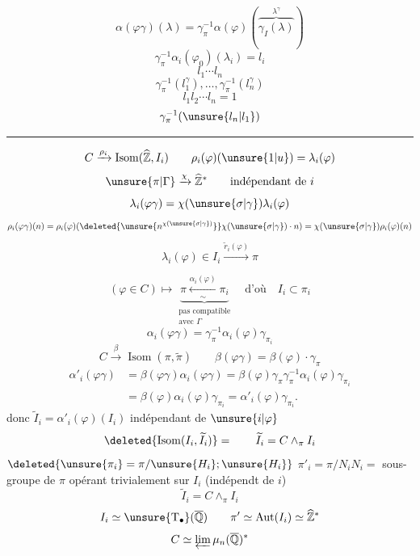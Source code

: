\[
\alpha(\varphi\gamma)(\lambda)=\gamma_\pi^{-1}\alpha(\varphi)(\overbrace{\gamma_I(\lambda)}^{\lambda^\gamma})
\]
\[
\gamma_\pi^{-1}\alpha_i(\varphi_0)(\lambda_i)=l_i
\]
\[
l_1\cdots l_n
\]
\[
\gamma_\pi^{-1}(l_1^\gamma),\ldots,\gamma_\pi^{-1}(l_n^\gamma)
\]
\[
l_1l_2\cdots l_n=1
\]
\[
\gamma_\pi^{-1}(\unsure{l_n|l_1})
\]
\par\noindent\rule{\linewidth}{0.3pt}
\[
C\xrightarrow{\rho_i}\operatorname{Isom}(\widehat{\mathbb Z},I_i)\qquad\rho_i(\varphi)(\unsure{1|u})=\lambda_i(\varphi)
\]
\[
\unsure{\pi|\Gamma}\xrightarrow{\chi}\widehat{\mathbb Z}^{*}\qquad\text{indépendant de $i$}
\]
\[
\lambda_i(\varphi\gamma)=\chi(\unsure{\sigma|\gamma})\lambda_i(\varphi)
\]
\[
\rho_i(\varphi\gamma)(n)=\rho_i(\varphi)(\deleted{\unsure{n^{\chi(\unsure{\sigma|\gamma})}}}\chi(\unsure{\sigma|\gamma})\cdot n)=\chi(\unsure{\sigma|\gamma})\rho_i(\varphi)(n)
\]
\[
\lambda_i(\varphi)\in I_i\xrightarrow{\widetilde r_i(\varphi)}\pi
\]

\[
(\varphi\in C)\longmapsto\underbrace{\pi\xleftarrow[\sim]{\alpha_i(\varphi)}\pi_i}_{\substack{\text{pas compatible}\\\text{avec }\Gamma}}\quad\text{d'où}\quad I_i\subset\pi_i
\]
\[
\alpha_i(\varphi\gamma)=\gamma_\pi^{-1}\alpha_i(\varphi)\gamma_{\pi_i}
\]
\[
C\xrightarrow{\beta}\operatorname{Isom}(\pi,\widetilde\pi)\qquad\beta(\varphi\gamma)=\beta(\varphi)\cdot\gamma_\pi
\]
\[
\begin{aligned}
\alpha'_i(\varphi\gamma)&=\beta(\varphi\gamma)\alpha_i(\varphi\gamma)=\beta(\varphi)\gamma_\pi\gamma_\pi^{-1}\alpha_i(\varphi)\gamma_{\pi_i}\\
&=\beta(\varphi)\alpha_i(\varphi)\gamma_{\pi_i}=\alpha'_i(\varphi)\gamma_{\pi_i}.
\end{aligned}
\]
donc $\widetilde I_i=\alpha'_i(\varphi)(I_i)$ indépendant de $\unsure{i|\varphi}$
\[
\deleted{\operatorname{Isom}(I_i,\widetilde I_i)}=\qquad\widetilde I_i=C\wedge_\pi I_i
\]
\quad $\deleted{\unsure{\pi_i}=\pi/\unsure{H_i};\unsure{H_i}}$
\quad $\pi'_i=\pi/N_i$\quad $N_i=$ sous-groupe de $\pi$ opérant trivialement sur $I_i$ (indépendt de $i$)
\[
\widetilde I_i=C\wedge_\pi I_i
\]
\[
I_i\simeq\unsure{\mathrm T_{\bullet}}(\overline{\mathbb Q})\qquad\pi'\simeq\operatorname{Aut}(I_i)\simeq\widehat{\mathbb Z}^{*}
\]
\[
C\simeq\varprojlim\mu_n(\overline{\mathbb Q})^{*}
\]

